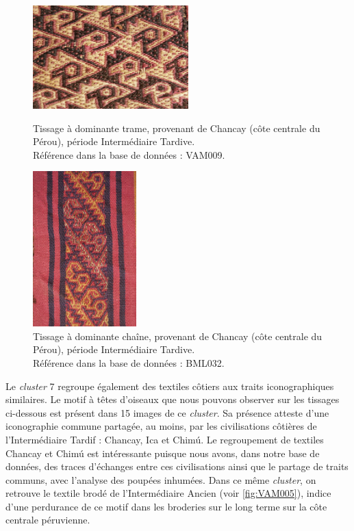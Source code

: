 \begin{figure}[!h]
 \begin{minipage}[c]{.5\linewidth}
        \begin{center}
        		\includegraphics[width=6cm]{../images/VAM009.jpg}
		\caption{Tissage à dominante trame, provenant de Chancay (côte centrale du Pérou), période Intermédiaire Tardive. \\ Référence dans la base de données : VAM009.}
		\label{fig:VAM009}
	\end{center}
    \end{minipage}
    \hspace{5pt}
    \begin{minipage}[c]{.5\linewidth}
        \begin{center}
        		\includegraphics[height=6cm]{../images/BML032.jpg}
		\caption{Tissage à dominante chaîne, provenant de Chancay (côte centrale du Pérou), période Intermédiaire Tardive. \\ Référence dans la base de données : BML032.}
		\label{fig:BML032}
	\end{center}
    \end{minipage}
\end{figure}

Le \textit{cluster} 7 regroupe également des textiles côtiers aux traits iconographiques similaires. Le motif à têtes d'oiseaux que nous pouvons observer sur les tissages ci-dessous est présent dans 15 images de ce \textit{cluster}. Sa présence atteste d'une iconographie commune partagée, au moins, par les civilisations côtières de l'Intermédiaire Tardif : Chancay, Ica et Chimú. Le regroupement de textiles Chancay et Chimú est intéressante puisque nous avons, dans notre base  de données, des traces d'échanges entre ces civilisations ainsi que le partage de traits communs, avec l'analyse des poupées inhumées. Dans ce même \textit{cluster}, on retrouve le textile brodé de l'Intermédiaire Ancien (voir \ref{fig:VAM005}), indice d'une perdurance de ce motif dans les broderies sur le long terme sur la côte centrale péruvienne. 

